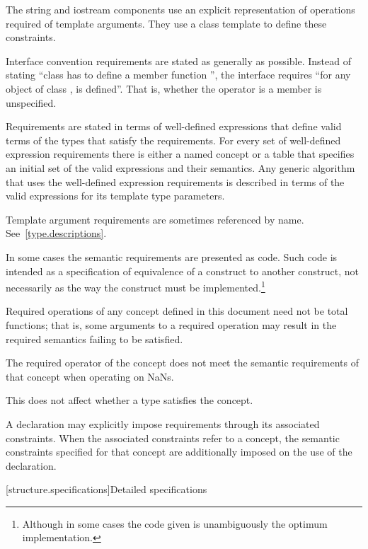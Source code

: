 \pnum
The string and iostream components use an explicit representation of operations
required of template arguments. They use a class template  to
define these constraints.

\pnum
Interface convention requirements are stated as generally as possible. Instead
of stating ``class  has to define a member function '', the
interface requires ``for any object  of class ,  is
defined''. That is, whether the operator is a member is unspecified.

\pnum
Requirements are stated in terms of well-defined expressions that define valid terms of
the types that satisfy the requirements. For every set of well-defined expression
requirements there is either a named concept or a table that specifies an initial set of the valid expressions and
their semantics. Any generic algorithm that uses the
well-defined expression requirements is described in terms of the valid expressions for
its template type parameters.

\pnum
Template argument requirements are sometimes referenced by name.
See~\ref{type.descriptions}.

\pnum
In some cases the semantic requirements are presented as \Cpp{} code.
Such code is intended as a
specification of equivalence of a construct to another construct, not
necessarily as the way the construct
must be implemented.\footnote{Although in some cases the code given is
unambiguously the optimum implementation.}

\pnum
Required operations of any concept defined in this document need not be
total functions; that is, some arguments to a required operation may
result in the required semantics failing to be satisfied.
\begin{example}
The required \tcode{<} operator of the 
concept does not meet the
semantic requirements of that concept when operating on NaNs.
\end{example}
This does not affect whether a type satisfies the concept.

\pnum
A declaration may explicitly impose requirements through its associated
constraints. When the associated constraints refer to a
concept, the semantic constraints specified for that concept
are additionally imposed on the use of the declaration.

[structure.specifications]{Detailed specifications}

